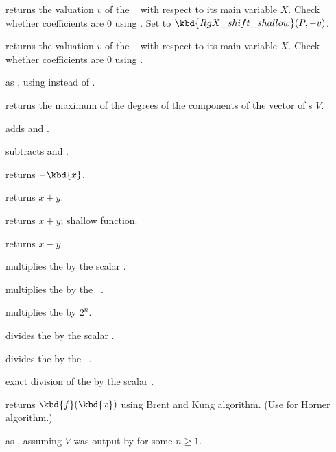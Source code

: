  returns the valuation $v$ of the
~ with respect to its main variable $X$. Check whether
coefficients are $0$ using . Set  to
$\kbd{RgX\_shift\_shallow}(P,-v)$.

 returns the valuation $v$ of the
~ with respect to its main variable $X$. Check whether
coefficients are $0$ using .

 as , using
 instead of .

 returns the maximum of the degrees of
the components of the vector of s $V$.


 adds  and .

 subtracts  and .

 returns $-\kbd{x}$.

 returns $x+y$.

 returns $x+y$; shallow function.


 returns $x-y$

 multiplies the  
by the scalar .

 multiplies the  
by the ~.

 multiplies the  
by $2^n$.

 divides the  
by the scalar .

 divides the  
by the ~.

 exact division of the 
 by the scalar .

 returns $\kbd{f}(\kbd{x})$ using
Brent and Kung algorithm. (Use  for Horner algorithm.)

 as ,
assuming $V$ was output by  for some $n\geq 1$.

